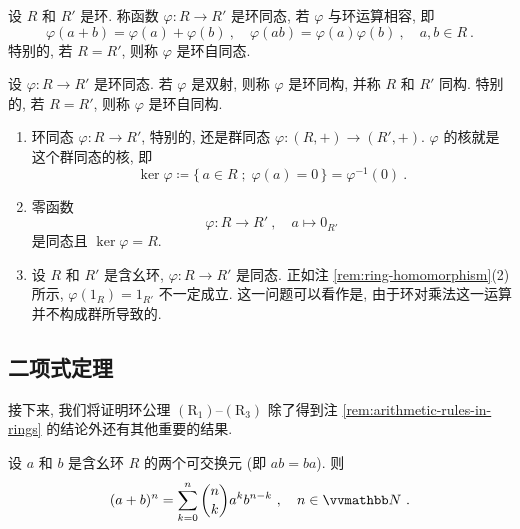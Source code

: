 \begin{definition}[环同态]
    设 \(R\) 和 \(R'\) 是环. 称函数 \(\varphi \colon R \to R'\) 是环同态, 若 \(\varphi\) 与环运算相容, 即
    \[
        \varphi(a + b) = \varphi(a) + \varphi(b)\ ,\quad \varphi(a b) = \varphi(a) \varphi(b)\ ,\quad a, b \in R\ .
    \]
    特别的, 若 \(R = R'\), 则称 \(\varphi\) 是环自同态.
\end{definition}

\begin{definition}[环同构]
    设 \(\varphi \colon R \to R'\) 是环同态. 若 \(\varphi\) 是双射, 则称 \(\varphi\) 是环同构, 并称 \(R\) 和 \(R'\) 同构. 特别的, 若 \(R = R'\), 则称 \(\varphi\) 是环自同构.
\end{definition}

\begin{remark}\label{rem:ring-homomorphism}
    \begin{enumerate}
        \item 环同态 \(\varphi \colon R \to R'\), 特别的, 还是群同态 \(\varphi \colon (R, +) \to (R', +)\). \(\varphi\) 的核就是这个群同态的核, 即
        \[
            \ker \varphi \coloneqq \{\, a \in R \;;\; \varphi(a) = 0 \,\} = \varphi^{-1}(0)\ .
        \]
        \item 零函数
        \[
            \varphi \colon R \to R'\ ,\quad a \mapsto 0_{R'}
        \]
        是同态且 \(\ker \varphi = R\).
        \item 设 \(R\) 和 \(R'\) 是含幺环, \(\varphi \colon R \to R'\) 是同态. 正如注 \ref{rem:ring-homomorphism}(2) 所示, \(\varphi(1_R) = 1_{R'}\) 不一定成立. 这一问题可以看作是, 由于环对乘法这一运算并不构成群所导致的.
    \end{enumerate}
\end{remark}

\subsection{二项式定理}

接下来, 我们将证明环公理 \hyperref[ax:ring]{\((\mathrm R_1)\)}--\hyperref[ax:ring]{\((\mathrm R_3)\)} 除了得到注 \ref{rem:arithmetic-rules-in-rings} 的结论外还有其他重要的结果.

\begin{theorem}[二项式定理]
    设 \(a\) 和 \(b\) 是含幺环 \(R\) 的两个可交换元 (即 \(a b = b a\)). 则
    \[
        (a + b)^n = \sum_{k = 0}^n \binom{n}{k} a^k b^{n - k}\ ,\quad n \in \N\ .
    \]
\end{theorem}

